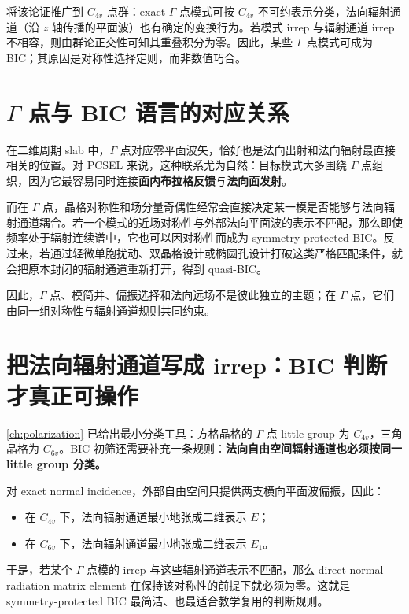 将该论证推广到 $C_{4v}$ 点群：exact $\Gamma$ 点模式可按 $C_{4v}$ 不可约表示分类，法向辐射通道（沿 $z$ 轴传播的平面波）也有确定的变换行为。若模式 irrep 与辐射通道 irrep 不相容，则由群论正交性可知其重叠积分为零。因此，某些 $\Gamma$ 点模式可成为 BIC；其原因是对称性选择定则，而非数值巧合。

\section{\texorpdfstring{$\Gamma$}{Gamma} 点与 BIC 语言的对应关系}
在二维周期 slab 中，$\Gamma$ 点对应零平面波矢，恰好也是法向出射和法向辐射最直接相关的位置。对 PCSEL 来说，这种联系尤为自然：目标模式大多围绕 $\Gamma$ 点组织，因为它最容易同时连接\textbf{面内布拉格反馈}与\textbf{法向面发射}。

而在 $\Gamma$ 点，晶格对称性和场分量奇偶性经常会直接决定某一模是否能够与法向辐射通道耦合。若一个模式的近场对称性与外部法向平面波的表示不匹配，那么即使频率处于辐射连续谱中，它也可以因对称性而成为 symmetry-protected BIC。反过来，若通过轻微单胞扰动、双晶格设计或椭圆孔设计打破这类严格匹配条件，就会把原本封闭的辐射通道重新打开，得到 quasi-BIC。

因此，$\Gamma$ 点、模简并、偏振选择和法向远场不是彼此独立的主题；在 $\Gamma$ 点，它们由同一组对称性与辐射通道规则共同约束。

\section{把法向辐射通道写成 irrep：BIC 判断才真正可操作}
\cref{ch:polarization} 已给出最小分类工具：方格晶格的 $\Gamma$ 点 little group 为 $C_{4v}$，三角晶格为 $C_{6v}$。BIC 初筛还需要补充一条规则：\textbf{法向自由空间辐射通道也必须按同一 little group 分类。}

对 exact normal incidence，外部自由空间只提供两支横向平面波偏振，因此：
\begin{itemize}
  \item 在 $C_{4v}$ 下，法向辐射通道最小地张成二维表示 $E$；
  \item 在 $C_{6v}$ 下，法向辐射通道最小地张成二维表示 $E_1$。
\end{itemize}
于是，若某个 $\Gamma$ 点模的 irrep 与这些辐射通道表示不匹配，那么 direct normal-radiation matrix element 在保持该对称性的前提下就必须为零。这就是 symmetry-protected BIC 最简洁、也最适合教学复用的判断规则。

